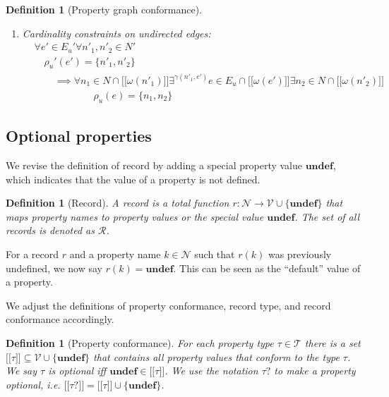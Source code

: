 \documentclass[a4paper]{article}
\newtheorem{definition}[theorem]{Definition}
\newcommand{\ptype}{\tau}
\newcommand{\ptypes}{\mathcal{T}}
\newcommand{\lsem}{\ensuremath{[\![}}
\newcommand{\rsem}{\ensuremath{]\!]}}
\newcommand{\sem}[1]{\ensuremath{\lsem #1 \rsem}}
\newcommand{\undefined}{\mathbf{undef}}
\begin{document}
\begin{definition}[Property graph conformance]
\begin{enumerate}
    \item Cardinality constraints on undirected edges:
    \begin{align*}
      &\forall e' \in E_u' \forall n'_1, n'_2 \in N'\\
      &\quad\rho_u'(e') = \{n'_1, n'_2\}\\
      &\quad\quad\implies {} \forall n_1 \in N \cap \sem{\omega(n'_1)} \exists^{\gamma(n'_1, e')} e \in E_u \cap \sem{\omega(e')} \exists n_2 \in N \cap \sem{\omega(n'_2)}\\
      &\quad\quad\quad\quad\quad\quad\rho_u(e) = \{n_1, n_2\}
    \end{align*}
  \end{enumerate}
\end{definition}

\subsection{Optional properties}

We revise the definition of record by adding a special property value $\undefined$, which indicates that the value of a property is not defined.

\begin{definition}[Record]
  A \emph{record} is a total function $r : \mathcal{N} \to \mathcal{V} \cup \{\undefined\}$ that maps property names to property values or the special value $\undefined$. The set of all records is denoted as $\mathcal{R}$.
\end{definition}

For a record $r$ and a property name $k \in \mathcal{N}$ such that $r(k)$ was previously undefined, we now say $r(k) = \undefined$. This can be seen as the ``default'' value of a property.

We adjust the definitions of property conformance, record type, and record conformance accordingly.

\begin{definition}[Property conformance]
  For each property type $\ptype \in \ptypes$ there is a set $\sem{\ptype} \subseteq \mathcal{V} \cup \{\undefined\}$ that contains all property values that \emph{conform} to the type $\ptype$. We say $\ptype$ is \emph{optional} iff $\undefined \in \sem{\ptype}$. We use the notation $\ptype?$ to make a property optional, i.e. $\sem{\ptype?} = \sem{\ptype} \cup \{ \undefined \}$.
\end{definition}
\end{document}
